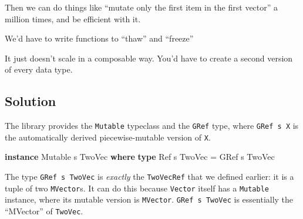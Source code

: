 \documentclass[]{article}
\newenvironment{Shaded}{}{}
\newcommand{\DataTypeTok}[1]{\textcolor[rgb]{0.56,0.13,0.00}{#1}}
\newcommand{\KeywordTok}[1]{\textcolor[rgb]{0.00,0.44,0.13}{\textbf{#1}}}
\newcommand{\NormalTok}[1]{#1}
\newcommand{\OperatorTok}[1]{\textcolor[rgb]{0.40,0.40,0.40}{#1}}
\newcommand{\OtherTok}[1]{\textcolor[rgb]{0.00,0.44,0.13}{#1}}
\begin{document}
Then we can do things like ``mutate only the first item in the first vector'' a
million times, and be efficient with it.

We'd have to write functions to ``thaw'' and ``freeze''

\begin{Shaded}
\end{Shaded}

It just doesn't scale in a composable way. You'd have to create a second version
of every data type.

\hypertarget{solution}{%
\subsection{Solution}\label{solution}}

The library provides the \texttt{Mutable} typeclass and the \texttt{GRef} type,
where \texttt{GRef\ s\ X} is the automatically derived piecewise-mutable version
of \texttt{X}.

\begin{Shaded}
\begin{Highlighting}[]
\KeywordTok{instance} \DataTypeTok{Mutable}\NormalTok{ s }\DataTypeTok{TwoVec} \KeywordTok{where}
    \KeywordTok{type} \DataTypeTok{Ref}\NormalTok{ s }\DataTypeTok{TwoVec} \OtherTok{=} \DataTypeTok{GRef}\NormalTok{ s }\DataTypeTok{TwoVec}
\end{Highlighting}
\end{Shaded}

The type \texttt{GRef\ s\ TwoVec} is \emph{exactly} the \texttt{TwoVecRef} that
we defined earlier: it is a tuple of two \texttt{MVector}s. It can do this
because \texttt{Vector} itself has a \texttt{Mutable} instance, where its
mutable version is \texttt{MVector}. \texttt{GRef\ s\ TwoVec} is essentially the
``MVector'' of \texttt{TwoVec}.
\end{document}
